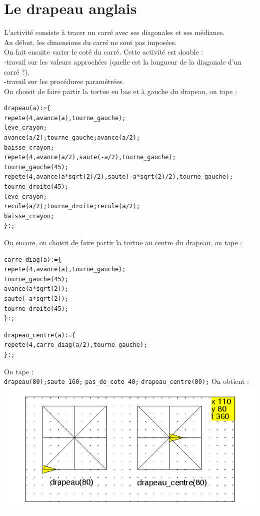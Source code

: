 \documentclass[a4paper,11pt]{book}
\begin{document}
\section{Le drapeau anglais}
L'activit\'e consiste \`a tracer un carr\'e avec ses diagonales et ses 
m\'edianes.\\
Au d\'ebut, les dimensions du carr\'e ne sont pas impos\'ees.\\
On fait ensuite varier le cot\'e du carr\'e.
Cette activit\'e est double :\\
-travail sur les valeurs approch\'ees (quelle est la longueur de la diagonale 
d'un carr\'e ?),\\
-travail sur les proc\'edures param\'etr\'ees.\\
On choisit de faire partir la tortue en bas et \`a gauche du drapeau, on tape :
\begin{verbatim}
drapeau(a):={
repete(4,avance(a),tourne_gauche);
leve_crayon;
avance(a/2);tourne_gauche;avance(a/2);
baisse_crayon;
repete(4,avance(a/2),saute(-a/2),tourne_gauche);
tourne_gauche(45);
repete(4,avance(a*sqrt(2)/2),saute(-a*sqrt(2)/2),tourne_gauche);
tourne_droite(45);
leve_crayon;
recule(a/2);tourne_droite;recule(a/2);
baisse_crayon;
}:;
\end{verbatim}
Ou encore, on choisit de faire partir la tortue au centre du drapeau, on tape :
\begin{verbatim}
carre_diag(a):={
repete(4,avance(a),tourne_gauche);
tourne_gauche(45);
avance(a*sqrt(2));
saute(-a*sqrt(2));
tourne_droite(45);
}:;
\end{verbatim}
\begin{verbatim}
drapeau_centre(a):={
repete(4,carre_diag(a/2),tourne_gauche);
}:;
\end{verbatim}
On tape :\\
{\tt drapeau(80);saute 160;}
{\tt pas\_de\_cote 40;}
{\tt drapeau\_centre(80);}
On obtient :\\
\includegraphics[width=\textwidth]{tortdrap}
\end{document}
